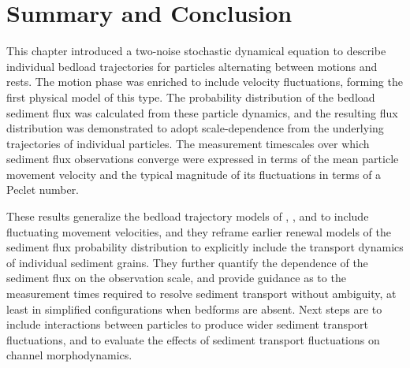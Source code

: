 \section{Summary and Conclusion \label{sec:conc}} 
 
This chapter introduced a two-noise stochastic dynamical equation to describe individual bedload trajectories for particles alternating between motions and rests. The motion phase was enriched to include velocity fluctuations, forming the first physical model of this type.
The probability distribution of the bedload sediment flux was calculated from these particle dynamics, and the resulting flux distribution was demonstrated to adopt scale-dependence from the underlying trajectories of individual particles. The measurement timescales over which sediment flux observations converge were expressed in terms of the mean particle movement velocity and the typical magnitude of its fluctuations in terms of a Peclet number.
 
These results generalize the bedload trajectory models of \citet{Einstein1937}, \citet{Lisle1998}, and \citet{Lajeunesse2018} to include fluctuating movement velocities, and they reframe earlier renewal models of the sediment flux probability distribution \citep{Lajeunesse1010,Ancey2020} to explicitly include the transport dynamics of individual sediment grains. They further quantify the dependence of the sediment flux on the observation scale, and provide guidance as to the measurement times required to resolve sediment transport without ambiguity, at least in simplified configurations when bedforms are absent. 
Next steps are to include interactions between particles to produce wider sediment transport fluctuations, and to evaluate the effects of sediment transport fluctuations on channel morphodynamics.




